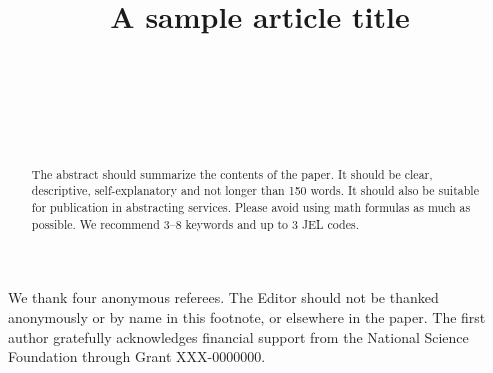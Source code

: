 \documentclass[qe,nameyear,final,openaccess]{econsocart}
\theoremstyle{plain}
\begin{document}
\begin{frontmatter}

\title{A sample article title}

\begin{aug}
%
%
%
\author[add1,add11]{~}
\author[add2]{~}
\author[add2]{~}
\address[add1]{%
,
}

\address[add11]{%
,
}

\address[add2]{%
,
}

\end{aug}

\begin{funding}
We thank four anonymous referees. The Editor should not be thanked anonymously or by name in this footnote, or elsewhere in the paper. The first author gratefully acknowledges financial support from the National Science Foundation through Grant XXX-0000000.
\end{funding}
%

\begin{abstract}
The abstract should summarize the contents of the paper. It should be clear, descriptive, self-explanatory and not longer than 150 words. It should also be suitable for publication in abstracting services. Please avoid using math formulas as much as possible. We recommend 3--8 keywords and up to 3 JEL codes.
\end{abstract}

\begin{keyword}
\end{keyword}

\begin{keyword}[class=JEL] %
\end{keyword}

\end{frontmatter}
\end{document}
